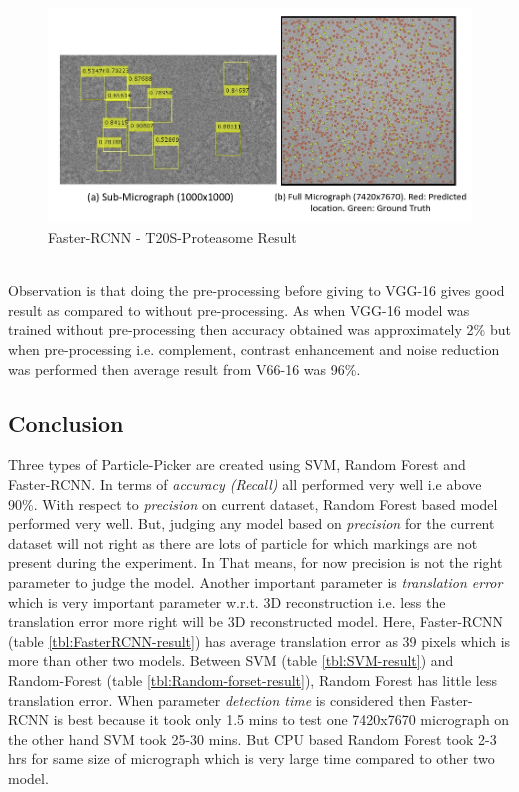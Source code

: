 \documentclass{report}
\begin{document}
\begin{figure}[H]
\includegraphics[width=1\linewidth]{fasterrcnn-result-T20.png}
\centering
\captionsetup{justification=centering}
\caption{Faster-RCNN - T20S-Proteasome Result}
\label{fig: fasetrcnnT20S-Proteasome-Result}
\end{figure}


\noindent\\
Observation is that doing the pre-processing before giving to VGG-16 gives good result as compared to without pre-processing. As when VGG-16 model was trained without pre-processing then accuracy obtained was approximately 2\% but when pre-processing i.e. complement, contrast enhancement and noise reduction was performed then average result from V66-16 was 96\%.

\subsection{Conclusion}

Three types of Particle-Picker are created using SVM, Random Forest and Faster-RCNN. In terms of \textit{accuracy (Recall)} all performed very well i.e above 90\%. With respect to 
\textit{precision} on current dataset, Random Forest based model performed very well. But, judging any model based on \textit{precision} \cite{wang2016deeppicker} \cite{xiao2017fastrcnn} for the current dataset will not right as there are lots of particle for which markings are not present during the experiment. In That means, for now precision is not the right parameter to judge the model. Another important parameter is \textit{translation error} which is very important parameter w.r.t. 3D reconstruction i.e. less the translation error more right will be 3D reconstructed model.  Here, Faster-RCNN (table \ref{tbl:FasterRCNN-result}) has average translation error as 39 pixels which is more than other two models. Between SVM (table \ref{tbl:SVM-result}) and Random-Forest (table \ref{tbl:Random-forset-result}), Random Forest has little less translation error. When parameter \textit{detection time} is considered then Faster-RCNN is best because it took only 1.5 mins to test one 7420x7670 micrograph on the other hand SVM took 25-30 mins. But CPU based Random Forest took 2-3 hrs for same size of micrograph which is very large time compared to other two model. \\
\end{document}
